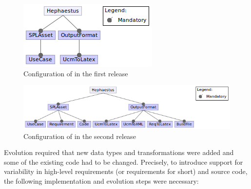 
\begin{figure}[t!]
\begin{center}
\includegraphics[scale=0.6]{imagens/conf1a-hp.png}
\caption{Configuration of \hp{} in the first release}
\label{fig:hephaestus-conf1a}
\end{center}
\end{figure}


\begin{figure}[t!]
\begin{center}
\includegraphics[scale=0.6]{imagens/conf1b-hp.png}
\caption{Configuration of \hp{} in the second release}
\label{fig:hephaestus-conf1b}
\end{center}
\end{figure}


Evolution required that new data types and transformations were added
and some of the existing code had to be changed. Precisely, to
introduce support for variability in high-level requirements (or
requirements for short) and source code, the following implementation
and evolution steps were necessary:

